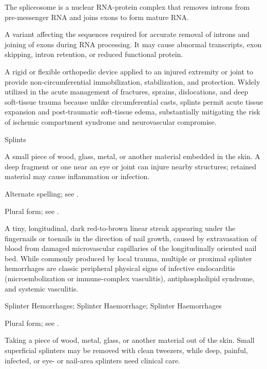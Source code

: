  The spliceosome is a nuclear RNA-protein complex that removes introns from pre-messenger RNA and joins exons to form mature RNA.

 A variant affecting the sequences required for accurate removal of introns and joining
of exons during RNA processing. It may cause abnormal transcripts, exon skipping, intron
retention, or reduced functional protein.

 A rigid or flexible orthopedic device applied to an injured extremity or joint to provide non-circumferential immobilization, stabilization, and protection. Widely utilized in the acute management of fractures, sprains, dislocations, and deep soft-tissue trauma because unlike circumferential casts, splints permit acute tissue expansion and post-traumatic soft-tissue edema, substantially mitigating the risk of ischemic compartment syndrome and neurovascular compromise.

\synonyms
Splints

 A small piece of wood, glass, metal, or another material embedded in the skin. A deep fragment or one near an eye or joint can injure nearby structures; retained material may cause inflammation or infection.

 Alternate spelling; see .

 Plural form; see .

 A tiny, longitudinal, dark red-to-brown linear streak appearing under the fingernails or toenails in the direction of nail growth, caused by extravasation of blood from damaged microvascular capillaries of the longitudinally oriented nail bed. While commonly produced by local trauma, multiple or proximal splinter hemorrhages are classic peripheral physical signs of infective endocarditis (microembolization or immune-complex vasculitis), antiphospholipid syndrome, and systemic vasculitis.

\synonyms
Splinter Hemorrhages; Splinter Haemorrhage; Splinter Haemorrhages

 Plural form; see .

 Taking a piece of wood, metal, glass, or another material out of the skin. Small superficial splinters may be removed with clean tweezers, while deep, painful, infected, or eye- or nail-area splinters need clinical care.

